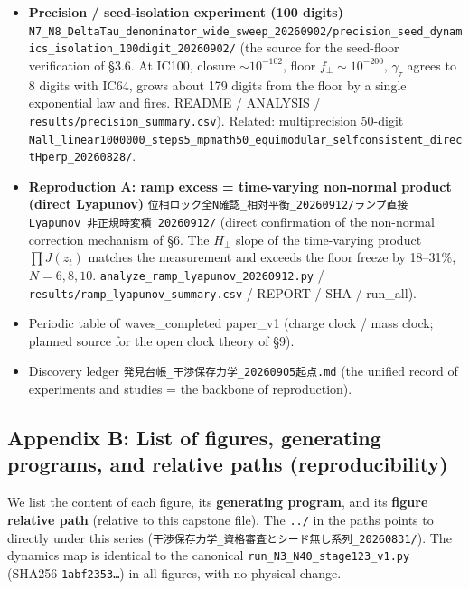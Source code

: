 \documentclass[
  a4paper,
]{ltjsarticle}
\providecommand{\tightlist}{%
  \setlength{\itemsep}{0pt}\setlength{\parskip}{0pt}}
\begin{document}
\begin{itemize}
\tightlist
\item
  \textbf{Precision / seed-isolation experiment (100 digits)}
  \texttt{N7\_N8\_DeltaTau\_denominator\_wide\_sweep\_20260902/precision\_seed\_dynamics\_isolation\_100digit\_20260902/}
  (the source for the seed-floor verification of §3.6. At IC100, closure
  \(\sim10^{-102}\), floor \(f_\perp\sim10^{-200}\), \(\gamma_\tau\)
  agrees to 8 digits with IC64, grows about 179 digits from the floor by
  a single exponential law and fires. README / ANALYSIS /
  \texttt{results/precision\_summary.csv}). Related: multiprecision
  50-digit
  \texttt{Nall\_linear1000000\_steps5\_mpmath50\_equimodular\_selfconsistent\_directHperp\_20260828/}.
\item
  \textbf{Reproduction A: ramp excess = time-varying non-normal product
  (direct Lyapunov)}
  \texttt{位相ロック全N確認\_相対平衡\_20260912/ランプ直接Lyapunov\_非正規時変積\_20260912/}
  (direct confirmation of the non-normal correction mechanism of §6. The
  \(H_\perp\) slope of the time-varying product \(\prod J(z_t)\) matches
  the measurement and exceeds the floor freeze by 18--31\%,
  \(N=6,8,10\). \texttt{analyze\_ramp\_lyapunov\_20260912.py} /
  \texttt{results/ramp\_lyapunov\_summary.csv} / REPORT / SHA /
  run\_all).
\item
  Periodic table of waves\_completed paper\_v1 (charge clock / mass
  clock; planned source for the open clock theory of §9).
\item
  Discovery ledger \texttt{発見台帳\_干渉保存力学\_20260905起点.md} (the
  unified record of experiments and studies = the backbone of
  reproduction).
\end{itemize}

\subsection{Appendix B: List of figures, generating programs, and
relative paths
(reproducibility)}\label{appendix-b-list-of-figures-generating-programs-and-relative-paths-reproducibility}

We list the content of each figure, its \textbf{generating program}, and
its \textbf{figure relative path} (relative to this capstone file). The
\texttt{../} in the paths points to directly under this series
(\texttt{干渉保存力学\_資格審査とシード無し系列\_20260831/}). The
dynamics map is identical to the canonical
\texttt{run\_N3\_N40\_stage123\_v1.py} (SHA256 \texttt{1abf2353…}) in
all figures, with no physical change.
\end{document}
